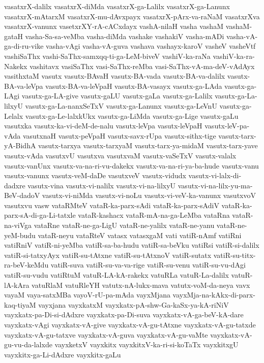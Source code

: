 {vasatxrX-dalilx
vasatxrX-diMda
vasatxrX-ga-Lalilx
vasatxrX-ga-Lanunx
vasatxrX-mAtarxM
vasatxrX-mu-dAvxpayx
vasatxrX-pArx-va-raNaM
vasatxrXva
vasatxrX-vanunx
vasetxrXY-rA-cACxdayx
vashA-nilaH
vasha
vashaM
vashaM-gataH
vasha-Sa-sa-veMba
vasha-diMda
vashake
vashakiV
vasha-mADi
vasha-vA-ga-di-ru-vike
vasha-vAgi
vasha-vA-guva
vashava
vashayx-karoV
vasheV
vasheVtf
vashiSaThx
vashi-SaThx-samxqq-ti-ga-LeM-biveV
vashiV-ka-raNa
vashiV-ka-ra-Nakekx
vashitavx
vasiSaThx
vasi-SaThx-reMba
vasi-SaThx-vA-ma-deV-vAdAyx
vasithxtaM
vasutx
vasutx-BAvaH
vasutx-BA-vada
vasutx-BA-va-dalilx
vasutx-BA-va-leVpa
vasutx-BA-va-leVpaH
vasutx-BA-vasayx
vasutx-ga-LAda
vasutx-ga-LAgi
vasutx-ga-LA-give
vasutx-gaLU
vasutx-gaLa
vasutx-ga-Lalilx
vasutx-ga-La-lilxyU
vasutx-ga-La-nanxSeTxV
vasutx-ga-Lanunx
vasutx-ga-LeVnU
vasutx-ga-Lelalx
vasutx-ga-Le-lalxkUkx
vasutx-ga-LiMda
vasutx-ga-Lige
vasutx-gaLu
vasutxka
vasutx-ka-vi-deM-de-nalu
vasutx-leVpa
vasutx-leVpaH
vasutx-leV-pa-vAda
vasutxnaH
vasutx-peVpaH
vasutx-savx-rUpa
vasutx-sithx-tige
vasutx-tarx-yA-BidhA
vasutx-tarxya
vasutx-tarxyaM
vasutx-tarx-ya-midaM
vasutx-tarx-yave
vasutx-vAda
vasutxvU
vasutxva
vasutxvaM
vasutx-vaSeTxV
vasutx-valalx
vasutx-vanUnx
vasutx-va-na-ri-vu-dakekx
vasutx-va-na-ri-ya-ba-hude
vasutx-vanu
vasutx-vanunx
vasutx-veM-daDe
vasutxveV
vasutx-vidudx
vasutx-vi-lalx-di-dadxre
vasutx-vina
vasutx-vi-nalilx
vasutx-vi-na-lilxyU
vasutx-vi-na-lilx-yu-ma-BeV-dadoV
vasutx-vi-niMda
vasutx-vi-noLu
vasutx-vi-veV-ka-vanunx
vasutxvoV
vasutxvu
vasw
vataRMteV
vataR-ka-parx-sAdi
vataR-ka-parx-sAdiV
vataR-ka-parx-sA-di-ga-Li-tatxle
vataR-kashacx
vataR-mA-na-ga-LeMba
vataRna
vataR-na-viVga
vataRne
vataR-ne-ga-LigU
vataR-ne-yalilx
vataR-ne-yanu
vataR-ne-yeM-budu
vataR-neyu
vataRteV
vatasx
vatasxgaM
vati
vatiR-nAmf
vatiRni
vatiRniV
vatiR-ni-yeMba
vatiR-sa-ba-hudu
vatiR-sa-beVku
vatiRsi
vatiR-si-dalilx
vatiR-si-tatxyAyx
vatiR-su-tAtxne
vatiR-su-tAtxnoV
vatiR-sutatx
vatiR-su-titx-ra-beV-keMdu
vatiR-suva
vatiR-su-va-va-rige
vatiR-su-venu
vatiR-su-vu-dAgi
vatiR-su-vudu
vatiRtuM
vatuR-LA-kA-rakekx
vatuRLa
vatuR-La-dalilx
vatuR-lA-kAra
vatuRlaM
vatuRleYH
vatutx-nA-lukx-mava
vatutx-voM-da-neya
vavx
vayaM
vaya-satxMBa
vayoV-rU-pa-mAda
vayxMjana
vayxMja-na-kAkx-di-parx-kaq-tiyaM
vayxjana
vayxkatxM
vayxkatx-pA-shw-Ga-kaSx-ya-kA-riNiV
vayxkatx-pa-Di-si-dAdxre
vayxkatx-pa-Di-suva
vayxkatx-vA-ga-beV-kA-dare
vayxkatx-vAgi
vayxkatx-vA-give
vayxkatx-vA-gu-tAtxne
vayxkatx-vA-gu-tatxde
vayxkatx-vA-gu-tatxve
vayxkatx-vA-guva
vayxkatx-vA-gu-vaMte
vayxkatx-vA-gu-vu-da-lalxde
vayxketxV
vayxkitx
vayxkitxV-ka-ri-si-koTaTx
vayxkitxgU
vayxkitx-ga-Li-dAdxre
vayxkitx-gaLu
}
